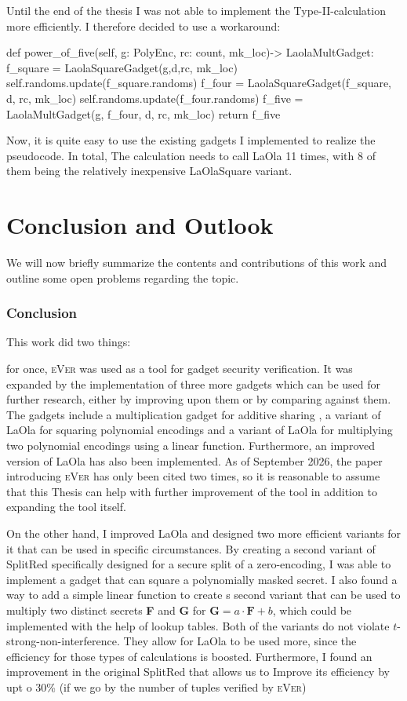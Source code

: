 \documentclass[english, version-2020-11]{uzl-thesis}
\newcommand{\toolname}[1]{\textsc{#1}}
\begin{document}
  Until the end of the thesis I was not able to implement the Type-II-calculation more efficiently. I therefore decided to use a workaround:
  
  \begin{Python}
   def power_of_five(self, g: PolyEnc, rc: count, mk_loc)-> LaolaMultGadget:
        f_square = LaolaSquareGadget(g,d,rc, mk_loc)
        self.randoms.update(f_square.randoms)
        f_four = LaolaSquareGadget(f_square, d, rc, mk_loc)
        self.randoms.update(f_four.randoms)
        f_five = LaolaMultGadget(g, f_four, d, rc, mk_loc)
        return f_five
  \end{Python}
  Now, it is quite easy to use the existing gadgets I implemented to realize the pseudocode. In total, The calculation needs to call LaOla 11 times, with 8 of them being the relatively inexpensive LaOlaSquare variant.


  \chapter{Conclusion and Outlook}
  We will now briefly summarize the contents and contributions of this work and outline some open problems regarding the topic.

  \subsection{Conclusion}
  This work did two things:
  
  for once, \toolname{eVer} was used as a tool for gadget security verification. It was expanded by the implementation of three more gadgets which can be used for further research, either by improving upon them or by comparing against them. The gadgets include a multiplication gadget for additive sharing \cite{Coron2015}, a variant of LaOla for squaring polynomial encodings and a variant of LaOla for multiplying two polynomial encodings using a linear function. Furthermore, an improved version of LaOla has also been implemented. As of September 2026, the paper introducing \toolname{eVer} has only been cited two times, so it is reasonable to assume that this Thesis can help with further improvement of the tool in addition to expanding the tool itself. 

  On the other hand, I improved LaOla and designed two more efficient variants for it that can be used in specific circumstances. By creating a second variant of SplitRed specifically designed for a secure split of a zero-encoding, I was able to implement a gadget that can square a polynomially masked secret. I also found a way to add a simple linear function to create s second variant that can be used to multiply two distinct secrets \textbf{F} and \textbf{G} for $\mathbf{G}=a\cdot\mathbf{F}+b$, which could be implemented with the help of lookup tables. Both of the variants do not violate $t$-strong-non-interference. They allow for LaOla to be used more, since the efficiency for those types of calculations is boosted. Furthermore, I found an improvement in the original SplitRed that allows us to Improve its efficiency by upt o 30\% (if we go by the number of tuples verified by \toolname{eVer})
\end{document}
